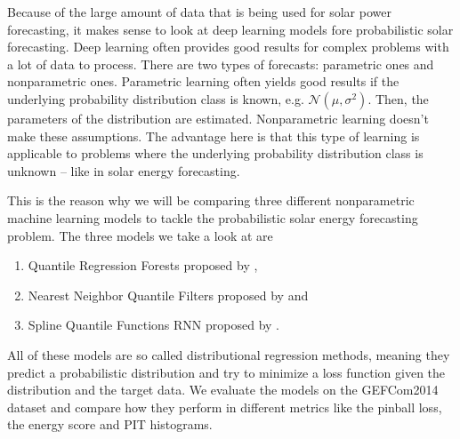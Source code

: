 Because of the large amount of data that is being used for solar power forecasting, it makes sense to look at 
deep learning models fore probabilistic solar forecasting. 
Deep learning often provides good results for complex problems with a lot of data to process. 
There are two types of forecasts: parametric ones and nonparametric ones. 
Parametric learning often yields good results if the underlying probability distribution class is known, e.g. \(\mathcal{N}(\mu, \sigma^2)\). 
Then, the parameters of the distribution are estimated. 
Nonparametric learning doesn't make these assumptions. 
The advantage here is that this type of learning is applicable to problems where the underlying 
probability distribution class is unknown -- like in solar energy forecasting. 



This is the reason why we will be comparing three different nonparametric machine learning models to tackle the probabilistic solar energy forecasting problem. 
The three models we take a look at are 
\begin{enumerate}
    \item Quantile Regression Forests proposed by \Textcite{Meinshausen2006},
    \item Nearest Neighbor Quantile Filters proposed by \Textcite{Ordiano2019} and
    \item Spline Quantile Functions RNN proposed by \Textcite{Gasthaus2019}.
\end{enumerate}
All of these models are so called distributional regression methods, meaning 
they predict a probabilistic distribution and try to minimize a loss function 
given the distribution and the target data.
We evaluate the models on the GEFCom2014 dataset and compare how they perform in different metrics like the pinball loss, the energy score and PIT histograms. 